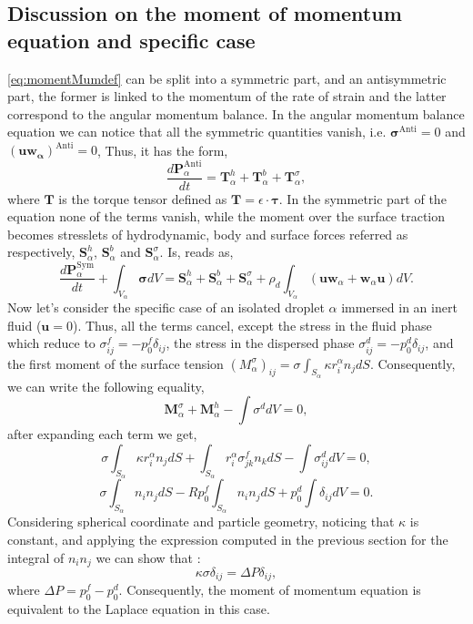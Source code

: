 \subsection{Discussion on the moment of momentum equation and specific case} 
\ref{eq:momentMumdef} can be split into a symmetric part, and an antisymmetric part, the former is linked to the momentum of the rate of strain and the latter correspond to the angular momentum balance.
In the angular momentum balance equation we can notice that all the symmetric quantities vanish, i.e. $\bm{\sigma}^{\text{Anti}} = 0$ and $(\bm{uw_\alpha})^{\text{Anti}} =0$, 
Thus, it has the form, 
\begin{equation}
    \frac{d\bm{P}_\alpha^{\text{Anti}}}{dt} 
    = \bm{T}_\alpha^{h}
    + \bm{T}_\alpha^{b}
    + \bm{T}_\alpha^\sigma,
\end{equation} 
where $\bm{T}$ is the torque tensor defined as $\bm{T} = \epsilon\cdot\bm{\tau}$.
In the symmetric part of the equation none of the terms vanish, while the moment over the surface traction becomes stresslets of hydrodynamic, body and surface forces referred as respectively, $\bm{S}_\alpha^h$, $\bm{S}_\alpha^b$ and $\bm{S}_\alpha^\sigma$. 
Is, reads as, 
\begin{equation}
    \frac{d\bm{P}_\alpha^{\text{Sym}}}{dt} 
    + \int_{V_\alpha} \bm{\sigma} dV
    = \bm{S}_\alpha^{h}
    + \bm{S}_\alpha^{b}
    + \bm{S}_\alpha^\sigma
    + \rho_d\int_{V_\alpha} (\bm{u}\bm{w}_\alpha+\bm{w}_\alpha\bm{u}) dV.
\end{equation} 
Now let's consider the specific case of an isolated droplet $\alpha$ immersed in an inert fluid ($\bm{u} = 0$).
Thus, all the terms cancel, except the stress in the fluid phase which reduce to $\sigma_{ij}^f = -p^f_0\delta_{ij}$,
the stress in the dispersed phase $\sigma_{ij}^d = -p^d_0 \delta_{ij}$,
and the first moment of the surface tension $(M^\sigma_\alpha)_{ij} =\sigma \int_{S_\alpha} \kappa r^\alpha_i n_j dS$.
Consequently, we can write the following equality, 
\begin{equation}
    \bm{M}^\sigma_\alpha 
    + \bm{M}^h_\alpha 
    - \int \sigma^d dV
    = 0,
\end{equation}
after expanding each term we get, 
\begin{equation}
    \sigma \int_{S_\alpha} \kappa r^\alpha_i  n_j  dS
    + \int_{S_\alpha}  r_i^\alpha \sigma_{jk}^f n_k dS
    - \int \sigma_{ij}^d dV
    = 0,
\end{equation}
\begin{equation}
    \sigma \int_{S_\alpha} n_i  n_j  dS
    - R p^f_0 \int_{S_\alpha} n_i n_j dS
    + p^d_0 \int\delta_{ij} dV
    = 0.
\end{equation}
Considering spherical coordinate and particle geometry, noticing that $\kappa$ is constant,   
and applying the expression computed in the previous section for the integral of $n_in_j$ we can show that : 
\begin{equation}
    \kappa \sigma \delta_{ij}= \Delta P \delta_{ij},
\end{equation}
where $\Delta P = p^f_0 - p^d_0$. 
Consequently, the moment of momentum equation is equivalent to the Laplace equation in this case. 

